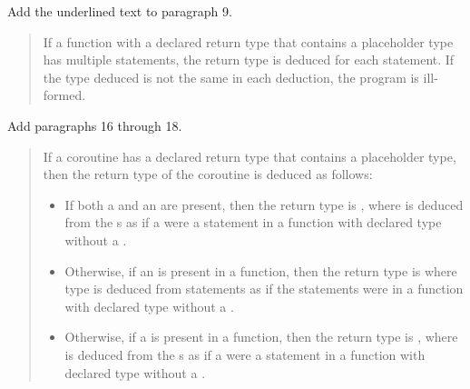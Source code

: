 Add the underlined text to paragraph 9.

\begin{quote}
\setcounter{Paras}{8}
\pnum
If a function with a declared return type that contains a placeholder type has
multiple  statements, the return type is deduced for each
 statement. If the type deduced is not the same in each
deduction, the program is ill-formed.
\end{quote}

Add paragraphs 16 through 18.

\begin{quote}
\setcounter{Paras}{15}

%

\pnum
If a coroutine has a declared return type that contains a placeholder type, then the return type of the coroutine is deduced as follows:

\begin{itemize}
\item If both a  and an  are present, then
the return type is , where  is deduced from the s as if a  were a  statement in a function with declared type  without a .


\item Otherwise, if an  is present in a function, then
the return type is\linebreak {} where type  is deduced from 
 statements as if the  statements were in a function with declared type  without a .


\item Otherwise, if a  is present in a function, then the return type is \linebreak
{},
where  is deduced from the s  as if a  were a  statement in a function with declared type  without a .


\end{itemize}
\end{quote}
